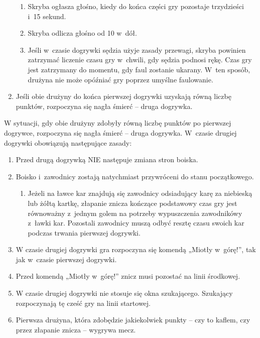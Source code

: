\documentclass[12pt,a4paper]{article}
\renewcommand{\subsubsection}[1]{
  \oldsubsubsection{#1}%
  \leftskip1.3cm
}
\begin{document}
\begin{enumerate}
\begin{enumerate}
		      \item Skryba ogłasza głośno, kiedy do końca części gry pozostaje
		            trzydzieści i~15 sekund.

		      \item Skryba odlicza głośno od 10 w~dół.

		      \item Jeśli w~czasie dogrywki sędzia użyje zasady przewagi, skryba
		            powinien zatrzymać liczenie czasu gry w~chwili, gdy sędzia podnosi rękę.
		            Czas gry jest zatrzymany do momentu, gdy faul zostanie ukarany. W~ten
		            sposób, drużyna nie może opóźniać gry poprzez umyślne faulowanie.
	      \end{enumerate}

	\item Jeśli obie drużyny do końca pierwszej dogrywki uzyskają równą liczbę
	      punktów, rozpoczyna się nagła śmierć -- druga dogrywka.
\end{enumerate}

\subsubsection{Nagła śmierć -- druga dogrywka}
W sytuacji, gdy obie
drużyny zdobyły równą liczbę punktów po pierwszej dogrywce, rozpoczyna
się nagła śmierć -- druga dogrywka. W~czasie drugiej dogrywki obowiązują
następujące zasady:

\begin{enumerate}
	\item Przed drugą dogrywką NIE następuje zmiana stron boiska.

	\item Boisko i~zawodnicy zostają natychmiast przywróceni do stanu
	      początkowego.
	      \begin{enumerate}
		      \item Jeżeli na ławce kar znajdują się zawodnicy odsiadujący karę za
		            niebieską lub żółtą kartkę, złapanie znicza kończące podstawowy czas gry
		            jest równoważny z~jednym golem na potrzeby wypuszczenia zawodnikówy z~ławki kar. Pozostali zawodnicy muszą odbyć resztę czasu swoich kar
		            podczas trwania pierwszej dogrywki.
	      \end{enumerate}
	\item W czasie drugiej dogrywki gra rozpoczyna się komendą „Miotły w~górę!'', tak jak w~czasie pierwszej dogrywki.

	\item Przed komendą „Miotły w~górę!'' znicz musi pozostać na linii środkowej.

	\item W czasie drugiej dogrywki nie stosuje się okna szukającego. Szukający
	      rozpoczynają tę cześć gry na linii startowej.

	\item Pierwsza drużyna, która zdobędzie jakiekolwiek punkty -- czy to
	      kaflem, czy przez złapanie znicza -- wygrywa mecz.
\end{enumerate}
\end{document}
